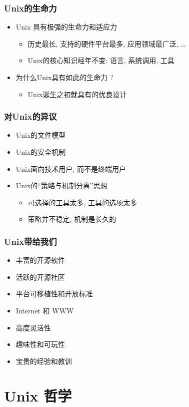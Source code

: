\documentclass[compress]{beamer}
\begin{document}
\begin{frame}
\frametitle{Unix的生命力}
\begin{itemize}
\item Unix 具有极强的生命力和适应力
    \begin{itemize}
    \item 历史最长, 支持的硬件平台最多, 应用领域最广泛, \ldots
    \item Unix的核心知识经年不变: 语言, 系统调用, 工具
    \end{itemize}
\item 为什么Unix具有如此的生命力 ?
    \begin{itemize}
    \item \alert{Unix诞生之初就具有的优良设计}
    \end{itemize}
\end{itemize}
\end{frame}

\begin{frame}
\frametitle{对Unix的异议}

\begin{itemize}
\item Unix的文件模型
\item Unix的安全机制
\item Unix面向技术用户, 而不是终端用户
\item Unix的``策略与机制分离''思想
  \begin{itemize}
	\item 可选择的工具太多, 工具的选项太多
	\item 策略并不稳定, 机制是长久的
  \end{itemize}
\end{itemize}
\end{frame}


\begin{frame}
\frametitle{Unix带给我们}
\begin{itemize}
\item 丰富的开源软件
\item 活跃的开源社区
\item 平台可移植性和开放标准
\item Internet 和 WWW 
\item 高度灵活性
\item 趣味性和可玩性
\item 宝贵的经验和教训
\end{itemize}
\end{frame}

\section{Unix 哲学}
\end{document}
